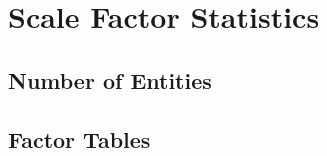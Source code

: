 \chapter{Scale Factor Statistics}
\label{sec:sf-statistics}

\section{Number of Entities}





\section{Factor Tables}



